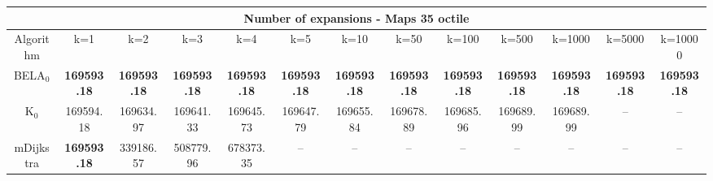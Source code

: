 \begin{tabular}{c|cccccccccccc}\toprule
\multicolumn{13}{c}{Number of expansions - Maps 35 octile}\\ \midrule
Algorithm & k=1 & k=2 & k=3 & k=4 & k=5 & k=10 & k=50 & k=100 & k=500 & k=1000 & k=5000 & k=10000 \\ \midrule
BELA$_0$ & \textbf{169593.18} & \textbf{169593.18} & \textbf{169593.18} & \textbf{169593.18} & \textbf{169593.18} & \textbf{169593.18} & \textbf{169593.18} & \textbf{169593.18} & \textbf{169593.18} & \textbf{169593.18} & \textbf{169593.18} & \textbf{169593.18} \\
K$_0$ & 169594.18 & 169634.97 & 169641.33 & 169645.73 & 169647.79 & 169655.84 & 169678.89 & 169685.96 & 169689.99 & 169689.99 & -- & -- \\
mDijkstra & \textbf{169593.18} & 339186.57 & 508779.96 & 678373.35 & -- & -- & -- & -- & -- & -- & -- & -- \\ \bottomrule 
\end{tabular}
